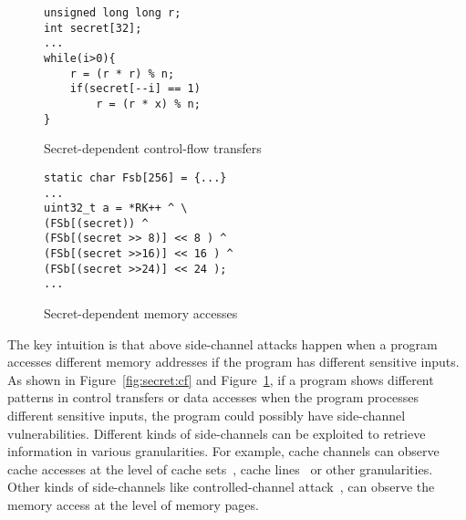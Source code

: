 \begin{figure}[]
    \noindent\begin{minipage}{0.45\linewidth}
        \noindent
        \begin{lstlisting}[numbers = none]
unsigned long long r;
int secret[32];
...
while(i>0){
    r = (r * r) % n;
    if(secret[--i] == 1)
        r = (r * x) % n;   
}
        \end{lstlisting}
\vspace*{-9pt}
        \caption{Secret-dependent control-flow transfers}
        \label{fig:secret:cf}
    \end{minipage}
    \hfill
    \begin{minipage}{0.45\linewidth}
        \begin{lstlisting}[numbers = none]
static char Fsb[256] = {...}
... 
uint32_t a = *RK++ ^ \ 
(FSb[(secret)) ^
(FSb[(secret >> 8)] << 8 ) ^
(FSb[(secret >>16)] << 16 ) ^
(FSb[(secret >>24)] << 24 );
...
        \end{lstlisting}
\vspace*{-9pt}
        \caption{Secret-dependent memory accesses}
        \label{fig:secret:da}
    \end{minipage}
\vspace*{-12pt}
\end{figure}

The key intuition is that above side-channel attacks happen when a
program accesses different memory addresses if the program has different
sensitive inputs. As shown in Figure~\ref{fig:secret:cf} and Figure~\ref{fig:secret:da}, 
if a program shows different patterns in
control transfers or data accesses when the program processes different
sensitive inputs, the program could possibly have side-channel vulnerabilities.
Different kinds of side-channels can be exploited to retrieve information in
various granularities. For example, cache channels can observe cache
accesses at the level of cache sets~\cite{liu2015last}, cache lines~\cite{184415} or other granularities. 
Other kinds of side-channels like controlled-channel attack~\cite{7163052},
can observe the memory access at the level of memory pages.

%

